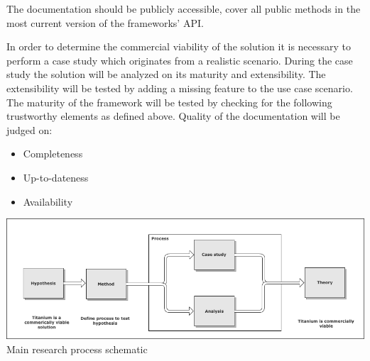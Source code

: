 The documentation should be publicly accessible, cover all public methods in the most current version of the frameworks' API.

%
%

In order to determine the commercial viability of the solution it is necessary to perform a case study which originates from a realistic scenario. During the case study the solution will be analyzed on its maturity and extensibility.  The extensibility will be tested by adding a missing feature to the use case scenario. The maturity of the framework will be tested by checking for the following trustworthy elements as defined above. Quality of the documentation will be judged on:
\begin{itemize}
	\item Completeness
	\item Up-to-dateness
	\item Availability
\end{itemize}

\begin{centering}
\includegraphics[scale=0.5]{images/process.png}\\{Main research process schematic}\\
\end{centering}







